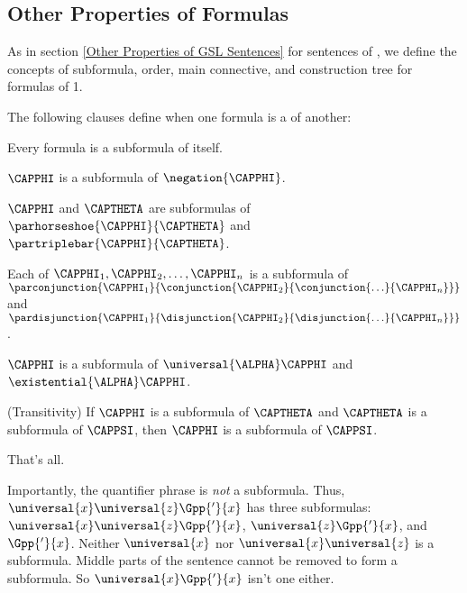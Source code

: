 \subsection{Other Properties of Formulas}\label{Other Properties of Formulas1} 
As in section \ref{Other Properties of GSL Sentences} for sentences of \GSL{}, we define the concepts of subformula, order, main connective, and construction tree for formulas of \GQL{}1. 
\begin{majorILnc}{}
The following clauses define when one formula is a  of another:
\begin{cenumerate}
	\item Every formula is a subformula of itself.
	\item $\CAPPHI$ is a subformula of $\negation{\CAPPHI}$.
	\item $\CAPPHI$ and $\CAPTHETA$ are subformulas of $\parhorseshoe{\CAPPHI}{\CAPTHETA}$ and $\partriplebar{\CAPPHI}{\CAPTHETA}$.
	\item Each of $\CAPPHI_1,\CAPPHI_2,\ldots,\CAPPHI_{\integer{n}}$ is a subformula of $\parconjunction{\CAPPHI_1}{\conjunction{\CAPPHI_2}{\conjunction{\ldots}{\CAPPHI_{\integer{n}}}}}$\\ and $\pardisjunction{\CAPPHI_1}{\disjunction{\CAPPHI_2}{\disjunction{\ldots}{\CAPPHI_{\integer{n}}}}}$.
	\item $\CAPPHI$ is a subformula of $\universal{\ALPHA}\CAPPHI$ and $\existential{\ALPHA}\CAPPHI$.
	\item (Transitivity) If $\CAPPHI$ is a subformula of $\CAPTHETA$ and $\CAPTHETA$ is a subformula of $\CAPPSI$, then $\CAPPHI$ is a subformula of $\CAPPSI$.
	\item That's all. 
\end{cenumerate}

\end{majorILnc}
\noindent{}Importantly, the quantifier phrase is \emph{not} a subformula. 
Thus, $\universal{\variable{x}}\universal{\variable{z}}\Gpp{'}{\variable{x}}$ has three subformulas: $\universal{\variable{x}}\universal{\variable{z}}\Gpp{'}{\variable{x}}$, $\universal{\variable{z}}\Gpp{'}{\variable{x}}$, and $\Gpp{'}{\variable{x}}$. 
Neither $\universal{\variable{x}}$ nor $\universal{\variable{x}}\universal{\variable{z}}$ is a subformula.
Middle parts of the sentence cannot be removed to form a subformula. So $\universal{\variable{x}}\Gpp{'}{\variable{x}}$ isn't one either.
